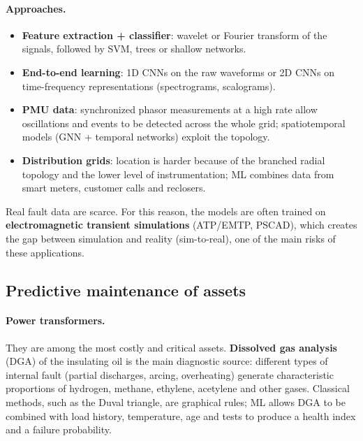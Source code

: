 \documentclass[10pt,a4paper,oneside]{article}
\begin{document}
\paragraph{Approaches.}
\begin{itemize}
  \item \textbf{Feature extraction + classifier}: wavelet or Fourier
    transform of the signals, followed by SVM, trees or shallow networks.
  \item \textbf{End-to-end learning}: 1D CNNs on the raw waveforms or 2D CNNs
    on time-frequency representations (spectrograms, scalograms).
  \item \textbf{PMU data}: synchronized phasor measurements at a high rate
    allow oscillations and events to be detected across the whole grid;
    spatiotemporal models (GNN + temporal networks) exploit the topology.
  \item \textbf{Distribution grids}: location is harder because of the
    branched radial topology and the lower level of instrumentation; ML
    combines data from smart meters, customer calls and reclosers.
\end{itemize}

Real fault data are scarce. For this reason, the models are often trained on
\textbf{electromagnetic transient simulations} (ATP/EMTP, PSCAD), which
creates the gap between simulation and reality (sim-to-real), one of the
main risks of these applications.

\subsection{Predictive maintenance of assets}

\paragraph{Power transformers.} They are among the most costly and critical
assets. \textbf{Dissolved gas analysis} (DGA) of the insulating oil is the
main diagnostic source: different types of internal fault (partial
discharges, arcing, overheating) generate characteristic proportions of
hydrogen, methane, ethylene, acetylene and other gases. Classical methods,
such as the Duval triangle, are graphical rules; ML allows DGA to be
combined with load history, temperature, age and tests to produce a health
index and a failure probability.
\end{document}
